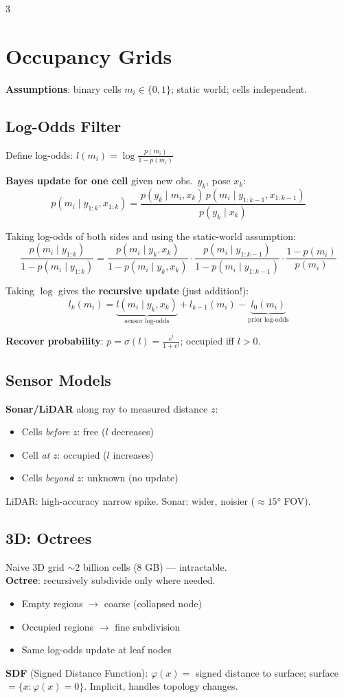 \documentclass[9pt,landscape]{article}
\begin{document}
\begin{multicols}{3}

\section{Occupancy Grids}

\textbf{Assumptions}: binary cells $m_i\in\{0,1\}$; static world; cells independent.

\subsection{Log-Odds Filter}
Define log-odds: $l(m_i)=\log\frac{p(m_i)}{1-p(m_i)}$

\textbf{Bayes update for one cell} given new obs.\ $y_k$, pose $x_k$:
\[p(m_i\mid y_{1:k},x_{1:k})=\frac{p(y_k\mid m_i,x_k)\,p(m_i\mid y_{1:k-1},x_{1:k-1})}{p(y_k\mid x_k)}\]

Taking log-odds of both sides and using the static-world assumption:
\[\frac{p(m_i\mid y_{1:k})}{1-p(m_i\mid y_{1:k})}=\frac{p(m_i\mid y_k,x_k)}{1-p(m_i\mid y_k,x_k)}\cdot\frac{p(m_i\mid y_{1:k-1})}{1-p(m_i\mid y_{1:k-1})}\cdot\frac{1-p(m_i)}{p(m_i)}\]

Taking $\log$ gives the \textbf{recursive update} (just addition!):
\[\boxed{l_k(m_i)=\underbrace{l(m_i\mid y_k,x_k)}_{\text{sensor log-odds}}+l_{k-1}(m_i)-\underbrace{l_0(m_i)}_{\text{prior log-odds}}}\]

\textbf{Recover probability}: $p=\sigma(l)=\frac{e^l}{1+e^l}$; occupied iff $l>0$.

\subsection{Sensor Models}
\textbf{Sonar/LiDAR} along ray to measured distance $z$:
\begin{itemize}
  \item Cells \emph{before} $z$: free ($l$ decreases)
  \item Cell \emph{at} $z$: occupied ($l$ increases)
  \item Cells \emph{beyond} $z$: unknown (no update)
\end{itemize}
LiDAR: high-accuracy narrow spike. Sonar: wider, noisier ($\approx15°$ FOV).

\subsection{3D: Octrees}
Naive 3D grid $\sim$2 billion cells (8 GB) — intractable.\\
\textbf{Octree}: recursively subdivide only where needed.
\begin{itemize}
  \item Empty regions $\to$ coarse (collapsed node)
  \item Occupied regions $\to$ fine subdivision
  \item Same log-odds update at leaf nodes
\end{itemize}
\textbf{SDF} (Signed Distance Function): $\varphi(x)=$ signed distance to surface; surface $=\{x:\varphi(x)=0\}$. Implicit, handles topology changes.


\end{multicols}
\end{document}
